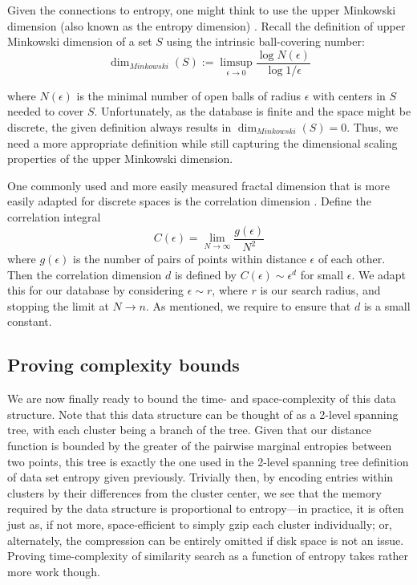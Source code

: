 \documentclass{amsbook}
\theoremstyle{definition}
\theoremstyle{remark}
\numberwithin{equation}{section}
\begin{document}
Given the connections to entropy, one might think to use the upper Minkowski dimension (also known as the entropy dimension) \cite{falconer2013fractal}.
Recall the definition of upper Minkowski dimension of a set $S$ using the intrinsic ball-covering number:
\[
    \dim_{Minkowski}(S) := \limsup_{\epsilon \to 0} \frac{\log N(\epsilon)}{\log 1/\epsilon}
\]

where $N(\epsilon)$ is the minimal number of open balls of radius $\epsilon$ with centers in $S$ needed to cover $S$.
Unfortunately, as the database is finite and the space might be discrete, the given definition always results in $\dim_{Minkowski}(S) = 0$.
Thus, we need a more appropriate definition while still capturing the dimensional scaling properties of the upper Minkowski dimension.

One commonly used and more easily measured fractal dimension that is more easily adapted for discrete spaces is the correlation dimension \cite{grassberger1984dimensions}.
Define the correlation integral
\[
    C(\epsilon) = \lim_{N \to \infty} \frac{g(\epsilon)}{N^2}
\]
where $g(\epsilon)$ is the number of pairs of points within distance $\epsilon$ of each other.
Then the correlation dimension $d$ is defined by $C(\epsilon) \sim \epsilon^d$ for small $\epsilon$.
We adapt this for our database by considering $\epsilon \sim r$, where $r$ is our search radius, and stopping the limit at $N \to n$.
As mentioned, we require to ensure that $d$ is a small constant.

\subsection{Proving complexity bounds}
We are now finally ready to bound the time- and space-complexity of this data structure.
Note that this data structure can be thought of as a 2-level spanning tree, with each cluster being a branch of the tree.
Given that our distance function is bounded by the greater of the pairwise marginal entropies between two points, this tree is exactly the one used in the 2-level spanning tree definition of data set entropy given previously.
Trivially then, by encoding entries within clusters by their differences from the cluster center, we see that the memory required by the data structure is proportional to entropy---in practice, it is often just as, if not more, space-efficient to simply gzip each cluster individually; or, alternately, the compression can be entirely omitted if disk space is not an issue.
Proving time-complexity of similarity search as a function of entropy takes rather more work though.
\end{document}
